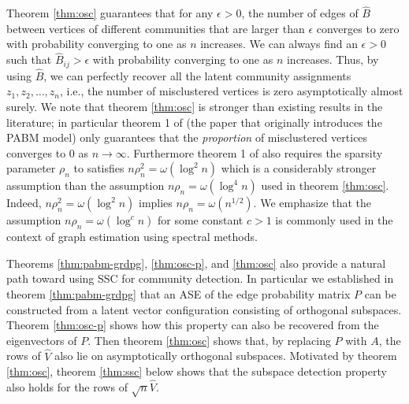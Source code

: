 \documentclass[
  11pt,
]{article}
\theoremstyle{definition}
\theoremstyle{definition}
\theoremstyle{definition}
\theoremstyle{definition}
\theoremstyle{remark}
\begin{document}
Theorem \ref{thm:osc} guarantees that for any \(\epsilon > 0\),
the number of edges of \(\hat{B}\) between vertices of different communities that are larger than \(\epsilon\) converges to zero with probability converging to one as \(n\) increases.
We can always find an \(\epsilon > 0\) such that \(\hat{B}_{ij} > \epsilon\) with probability converging to one as \(n\) increases.
Thus, by using \(\hat{B}\), we can perfectly recover all the latent community assignments \(z_1, z_2, \dots, z_n\), i.e., the number of misclustered vertices is zero asymptotically almost surely.
We note that theorem \ref{thm:osc} is stronger than existing results in the literature;
in particular theorem 1 of \citet{307cbeb9b1be48299388437423d94bf1} (the paper that
originally introduces the PABM model) only guarantees that the \emph{proportion} of misclustered vertices converges to \(0\) as \(n \rightarrow \infty\).
Furthermore theorem 1 of \citet{307cbeb9b1be48299388437423d94bf1} also requires the sparsity parameter \(\rho_n\) to satisfies \(n \rho_n^2 = \omega(\log^2{n})\) which is a considerably stronger assumption than the assumption \(n \rho_n =\omega(\log^{4}{n})\) used in theorem \ref{thm:osc}.
Indeed, \(n\rho_n^2 = \omega(\log^{2}{n})\) implies \(n \rho_n = \omega(n^{1/2})\).
We emphasize that the assumption \(n \rho_n = \omega(\log^{c}{n})\) for some constant \(c > 1\) is commonly used in the context of graph estimation using spectral methods.

Theorems \ref{thm:pabm-grdpg}, \ref{thm:osc-p}, and \ref{thm:osc} also provide
a natural path toward using SSC for community detection.
In particular we established in theorem \ref{thm:pabm-grdpg} that an ASE of the edge
probability matrix \(P\) can be constructed from a latent vector configuration
consisting of orthogonal subspaces. Theorem \ref{thm:osc-p} shows how
this property can also be recovered from the eigenvectors of \(P\).
Then theorem \ref{thm:osc} shows that, by replacing \(P\) with \(A\), the
rows of \(\hat{V}\) also lie on asymptotically orthogonal subspaces.
Motivated by theorem \ref{thm:osc}, theorem \ref{thm:ssc} below
shows that the subspace detection property also holds for the rows of
\(\sqrt{n} \hat{V}\).
\end{document}
